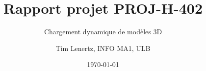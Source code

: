 \documentclass[a4paper,12pt]{scrreprt}
\title{Rapport projet PROJ-H-402}
\subtitle{Chargement dynamique de modèles 3D}
\author{Tim Lenertz, INFO MA1, ULB}
\date{\today}
\begin{document}
\maketitle{}

\tableofcontents{}
\end{document}
